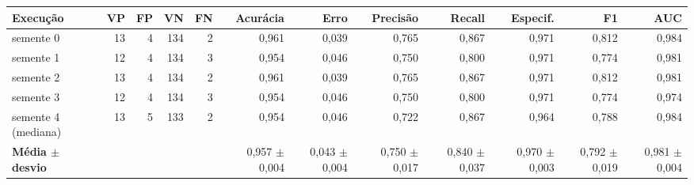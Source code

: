 \begin{tabular}{lrrrrrrrrrrr}
\toprule
Execução & VP & FP & VN & FN & Acurácia & Erro & Precisão & Recall & Especif. & F1 & AUC \\
\midrule
semente 0 & 13 & 4 & 134 & 2 & 0,961 & 0,039 & 0,765 & 0,867 & 0,971 & 0,812 & 0,984 \\
semente 1 & 12 & 4 & 134 & 3 & 0,954 & 0,046 & 0,750 & 0,800 & 0,971 & 0,774 & 0,981 \\
semente 2 & 13 & 4 & 134 & 2 & 0,961 & 0,039 & 0,765 & 0,867 & 0,971 & 0,812 & 0,981 \\
semente 3 & 12 & 4 & 134 & 3 & 0,954 & 0,046 & 0,750 & 0,800 & 0,971 & 0,774 & 0,974 \\
semente 4 (mediana) & 13 & 5 & 133 & 2 & 0,954 & 0,046 & 0,722 & 0,867 & 0,964 & 0,788 & 0,984 \\
\midrule
\textbf{Média $\pm$ desvio} & & & & & 0,957 $\pm$ 0,004 & 0,043 $\pm$ 0,004 & 0,750 $\pm$ 0,017 & 0,840 $\pm$ 0,037 & 0,970 $\pm$ 0,003 & 0,792 $\pm$ 0,019 & 0,981 $\pm$ 0,004 \\
\bottomrule
\end{tabular}
